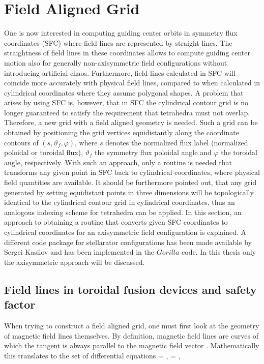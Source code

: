 \documentclass[./main.tex]{subfiles}
\begin{document}
\section{Field Aligned Grid}
One is now interested in computing guiding center orbits in symmetry flux coordinates (SFC) where field lines are represented by straight lines. The straightness of field lines in these coordinates allows to compute guiding center motion also for generally non-axisymmetric field configurations without introducing artificial chaos. Furthermore, field lines calculated in SFC will coincide more accurately with physical field lines, compared to when calculated in cylindrical coordinates where they assume polygonal shapes. A problem that arises by using SFC is, however, that in SFC the cylindrical contour grid is no longer guaranteed to satisfy the requirement that tetrahedra must not overlap. Therefore, a new grid with a field aligned geometry is needed. Such a grid can be obtained by positioning the grid vertices equidistantly along the coordinate contours of $(s,\vartheta_f,\varphi)$, where $s$ denotes the normalized flux label (normalized poloidal or toroidal flux), $\vartheta_f$ the symmetry flux poloidal angle and $\varphi$ the toroidal angle, respectively. With such an approach, only a routine is needed that transforms any given point in SFC back to cylindrical coordinates, where physical field quantities are available. It should be furthermore pointed out, that any grid generated by setting equidistant points in three dimensions will be topologically identical to the cylindrical contour grid in cylindrical coordinates, thus an analogous indexing scheme for tetrahedra can be applied. In this section, an approach to obtaining a routine that converts given SFC coordinates to cylindrical coordinates for an axisymmetric field configuration is explained. A different code package for stellarator configurations has been made available by Sergei Kasilov and has been implemented in the $Gorilla$ code. In this thesis only the axisymmetric approach will be discussed. 

\subsection{Field lines in toroidal fusion devices and safety factor}
When trying to construct a field aligned grid, one must first look at the geometry of magnetic field lines themselves. By definition, magnetic field lines are curves of which the tangent is always parallel to the magnetic field vector \cite{haeseleer}. Mathematically this translates to the set of differential equations
 = , \hspace{0.1cm}  = ,
\ee
\end{document}
